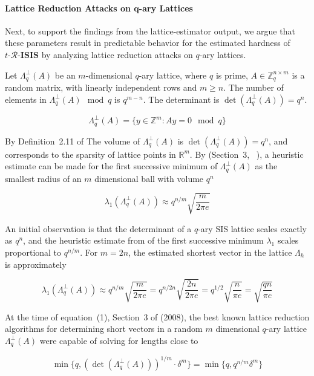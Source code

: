 \paragraph{Lattice Reduction Attacks on q-ary Lattices}\label{lattice-reduction-attacks-on-q-ary-lattices}

Next, to support the findings from the lattice-estimator output, we argue that these parameters result 
in predictable behavior for the estimated hardness of $t\text{-}\mathcal{R}\text{-}\mathbf{ISIS}$
by analyzing lattice reduction attacks on \(q\)-ary lattices. 

Let \(\Lambda_q^\perp(A)\) be an \(m\)-dimensional
\(q\)-ary lattice, where \(q\) is prime, \(A \in \mathbb{Z}_q^{n \times m}\) is a random matrix, 
with linearly independent rows and \(m \ge n\). 
The number of elements in \(\Lambda_q^\perp(A) \mod q\) is \(q^{m-n}\).
The determinant is \(\det(\Lambda_q^\perp(A)) = q^n\).

\[
\Lambda_q^\perp(A) = \{y \in \mathbb{Z}^m : Ay = 0 \mod q\}
\]


By Definition~2.11 of \cite{Menezes2026GentleIntro} 
The volume of \(\Lambda_q^\perp(A)\) is \(\det(\Lambda_q^\perp(A)) = q^n\), and 
corresponds to the sparsity of lattice points in \(\mathbb{R}^m\).
By (Section~3, ~\cite{Regev2009LatticeSurvey}), a heuristic estimate can be made for 
the first successive minimum of \(\Lambda_q^\perp(A)\) as the smallest radius of
an \(m\) dimensional ball with volume \(q^n\)

\[
\lambda_1(\Lambda_q^\perp(A)) \approx q^{n/m} \sqrt{\frac{m}{2\pi e}}
\]

An initial observation is that the determinant of a \(q\)-ary SIS
lattice scales exactly as \(q^n\), and the heuristic estimate from
\cite{Regev2009LatticeSurvey}
of the first successive minimum \(\lambda_1\) scales proportional to
\(q^{n/m}\). For \(m=2n\), the estimated shortest vector in the lattice
\(\Lambda_h\) is approximately

\[
\lambda_1(\Lambda_q^\perp(A)) \approx q^{n/m} \sqrt{\frac{m}{2\pi e}} 
= q^{n/2n} \sqrt{\frac{2n}{2\pi e}}  
= q^{1/2} \sqrt{\frac{n}{\pi e}}  
= \sqrt{\frac{qn}{\pi e}}  
\]

At the time of equation~(1), Section~3 of
\cite{Regev2009LatticeSurvey} (2008), the best known lattice reduction algorithms for determining
short vectors in a random \(m\) dimensional \(q\)-ary lattice
\(\Lambda^\perp_q(A)\) were capable of solving for lengths close to

\[
\min\{q, (\det(\Lambda^\perp_q(A)))^{1/m} \cdot \delta^m\} = \min\{q, q^{n/m}\delta^m\}
\]

